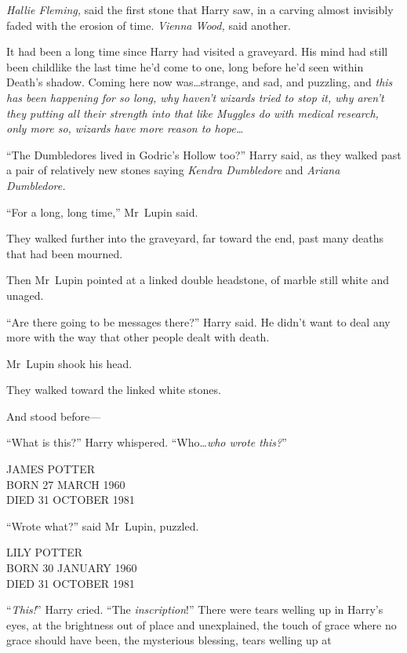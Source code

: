 \emph{Hallie Fleming,} said the first stone that Harry saw, in a carving almost invisibly faded with the erosion of time. \emph{Vienna Wood,} said another.

It had been a long time since Harry had visited a graveyard. His mind had still been childlike the last time he’d come to one, long before he’d seen within Death’s shadow. Coming here now was…strange, and sad, and puzzling, and \emph{this has been happening for so long, why haven’t wizards tried to stop it, why aren’t they putting all their strength into that like Muggles do with medical research, only more so, wizards have more reason to hope…}

“The Dumbledores lived in Godric’s Hollow too?” Harry said, as they walked past a pair of relatively new stones saying \emph{Kendra Dumbledore} and \emph{Ariana Dumbledore.}

“For a long, long time,” Mr~Lupin said.

They walked further into the graveyard, far toward the end, past many deaths that had been mourned.

Then Mr~Lupin pointed at a linked double headstone, of marble still white and unaged.

“Are there going to be messages there?” Harry said. He didn’t want to deal any more with the way that other people dealt with death.

Mr~Lupin shook his head.

They walked toward the linked white stones.

And stood before—

“What is this?” Harry whispered.
“Who…\emph{who wrote this?}”

\begin{center}
JAMES POTTER\\
BORN 27 MARCH 1960\\
DIED 31 OCTOBER 1981
\end{center}

“Wrote what?” said Mr~Lupin, puzzled.

\begin{center}
LILY POTTER\\
BORN 30 JANUARY 1960\\
DIED 31 OCTOBER 1981
\end{center}

“\emph{This!}” Harry cried.
“The \emph{inscription}!” There were tears welling up in Harry’s eyes, at the brightness out of place and unexplained, the touch of grace where no grace should have been, the mysterious blessing, tears welling up at

